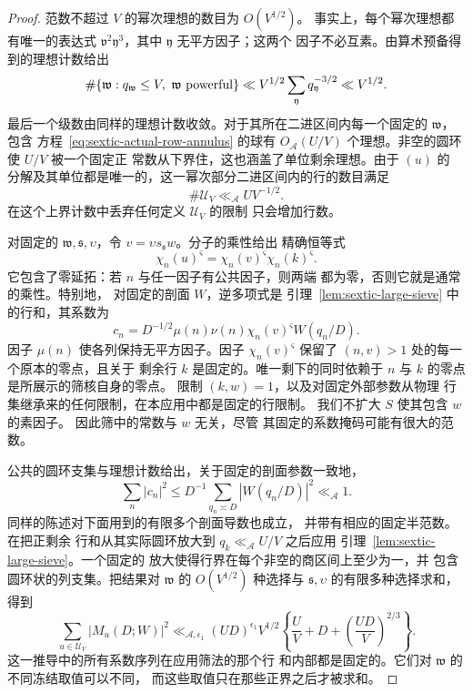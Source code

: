 \begin{proof}
范数不超过 $V$ 的幂次理想的数目为 $O(V^{1/2})$。
事实上，每个幂次理想都有唯一的表达式
$\mathfrak v^2\mathfrak y^3$，其中 $\mathfrak y$ 无平方因子；这两个
因子不必互素。由算术预备得到的理想计数给出
\[
 \#\{\mathfrak w:q_{\mathfrak w}\le V,\ \mathfrak w\ {\rm powerful}\}
 \ll V^{1/2}\sum_{\mathfrak y}q_{\mathfrak y}^{-3/2}
 \ll V^{1/2}.
\]
最后一个级数由同样的理想计数收敛。对于其所在二进区间内每一个固定的
$\mathfrak w$，包含
方程~\eqref{eq:sextic-actual-row-annulus} 的球有 $O_{\mathcal A}(U/V)$
个理想。非空的圆环使 $U/V$ 被一个固定正
常数从下界住，这也涵盖了单位剩余理想。由于 $(u)$ 的
分解及其单位都是唯一的，这一幂次部分二进区间内的行的数目满足
\begin{equation}\label{eq:sextic-stratum-cardinality}
 \#\mathcal U_V\ll_{\mathcal A}U V^{-1/2}.
\end{equation}
在这个上界计数中丢弃任何定义 $\mathcal U_V$ 的限制
只会增加行数。

对固定的 $\mathfrak w,\mathfrak s,\upsilon$，令
$v=\upsilon s_{\mathfrak s}w$。分子的乘性给出
精确恒等式
\begin{equation}\label{eq:sextic-frozen-mask}
 \chi_n(u)^{\varsigma}
   =\chi_n(v)^{\varsigma}\chi_n(k)^{\varsigma}.
\end{equation}
它包含了零延拓：若 $n$ 与任一因子有公共因子，则两端
都为零，否则它就是通常的乘性。特别地，
对固定的剖面 $W$，逆多项式是
引理~\ref{lem:sextic-large-sieve} 中的行和，其系数为
\[
 c_n=D^{-1/2}\mu(n)\nu(n)\chi_n(v)^{\varsigma}W(q_n/D).
\]
因子 $\mu(n)$ 使各列保持无平方因子。因子
$\chi_n(v)^{\varsigma}$ 保留了 $(n,v)>1$ 处的每一个原本的零点，且关于
剩余行 $k$ 是固定的。唯一剩下的同时依赖于
$n$ 与 $k$ 的零点是所展示的筛核自身的零点。
限制 $(k,w)=1$，以及对固定外部参数从物理
行集继承来的任何限制，在本应用中都是固定的行限制。
我们不扩大 $S$ 使其包含 $w$ 的素因子。
因此筛中的常数与 $w$ 无关，尽管
其固定的系数掩码可能有很大的范数。

公共的圆环支集与理想计数给出，关于固定的剖面参数一致地，
\[
 \sum_n|c_n|^2
 \le D^{-1}\sum_{q_n\asymp D}|W(q_n/D)|^2\ll_{\mathcal A}1.
\]
同样的陈述对下面用到的有限多个剖面导数也成立，
并带有相应的固定半范数。在把正剩余
行和从其实际圆环放大到 $q_k\ll_{\mathcal A}U/V$ 之后应用
引理~\ref{lem:sextic-large-sieve}。一个固定的
放大使得行界在每个非空的商区间上至少为一，并
包含圆环状的列支集。把结果对
$\mathfrak w$ 的 $O(V^{1/2})$ 种选择与
$\mathfrak s,\upsilon$ 的有限多种选择求和，得到
\begin{equation}\label{eq:sextic-stratum-fixed-moment}
 \sum_{u\in\mathcal U_V}|M_u(D;W)|^2
 \ll_{\mathcal A,\epsilon_1}(UD)^{\epsilon_1}V^{1/2}
 \left\{\frac UV+D+\left(\frac{UD}{V}\right)^{2/3}\right\}.
\end{equation}
这一推导中的所有系数序列在应用筛法的那个行
和内部都是固定的。它们对 $\mathfrak w$ 的不同冻结取值可以不同，
而这些取值只在那些正界之后才被求和。


\end{proof}
